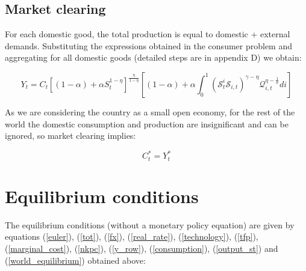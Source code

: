 \documentclass{article}
\begin{document}
\subsection{Market clearing}
For each domestic good, the total production is equal to domestic + external demands. Substituting the expressions obtained in the consumer problem and aggregating for all domestic goods (detailed steps are in appendix D) we obtain:

\begin{equation}
    \label{output_st}
    Y_{t} = C_t \left[(1-\alpha) + \alpha S_t^{1-\eta} \right]^{\frac{\eta}{1-\eta}} \left[(1-\alpha)  +  \alpha \int_0^1 \left(\mathcal S^i_t \mathcal S_{i,t} \right)^{\gamma - \eta} \mathcal Q^{\eta - \frac{1}{\sigma}}_{i,t} di \right] 
\end{equation}



As we are considering the country as a small open economy, for the rest of the world the domestic consumption and production are insignificant and can be ignored, so market clearing implies:

\begin{equation}
    \label{world_equilibrium}
    C_t^* = Y_t^*
\end{equation}

\section{Equilibrium conditions}
The equilibrium conditions (without a monetary policy equation) are given by equations (\ref{euler}), (\ref{tot}), (\ref{fx}), (\ref{real_rate}), (\ref{technology}), (\ref{tfp}), (\ref{marginal_cost}), (\ref{nkpc}), (\ref{y_row}), (\ref{consumption}), (\ref{output_st}) and (\ref{world_equilibrium}) obtained above:
\end{document}
